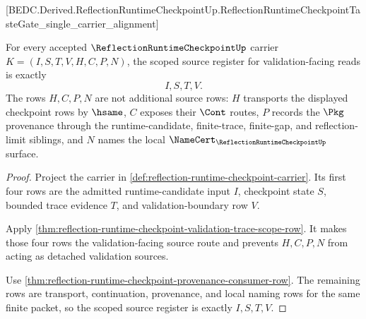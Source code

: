 

[BEDC.Derived.ReflectionRuntimeCheckpointUp.ReflectionRuntimeCheckpointTasteGate\_single\_carrier\_alignment]

\begin{theorem}
\label{thm:reflection-runtime-checkpoint-scope-source-register}
For every accepted $\ReflectionRuntimeCheckpointUp$ carrier $K=(I,S,T,V,H,C,P,N)$, the scoped source register for validation-facing reads is exactly
$$
I,S,T,V.
$$
The rows $H,C,P,N$ are not additional source rows: $H$ transports the displayed checkpoint rows by $\hsame$, $C$ exposes their $\Cont$ routes, $P$ records the $\Pkg$ provenance through the runtime-candidate, finite-trace, finite-gap, and reflection-limit siblings, and $N$ names the local $\NameCert_{\ReflectionRuntimeCheckpointUp}$ surface.
\end{theorem}
\begin{proof}
Project the carrier in \autoref{def:reflection-runtime-checkpoint-carrier}. Its first four rows are the admitted runtime-candidate input $I$, checkpoint state $S$, bounded trace evidence $T$, and validation-boundary row $V$.

Apply \autoref{thm:reflection-runtime-checkpoint-validation-trace-scope-row}. It makes those four rows the validation-facing source route and prevents $H,C,P,N$ from acting as detached validation sources.

Use \autoref{thm:reflection-runtime-checkpoint-provenance-consumer-row}. The remaining rows are transport, continuation, provenance, and local naming rows for the same finite packet, so the scoped source register is exactly $I,S,T,V$.
\end{proof}

